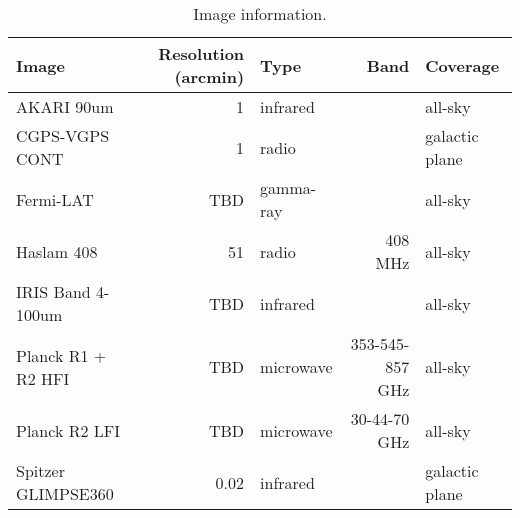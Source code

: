 
\begin{table}[tb]

\caption{Image information.}
\label{tab:images}
\begin{tabular}{ lrlrl }
\hline


Image & Resolution (arcmin) & Type & Band & Coverage\\ \hline
AKARI 90um & 1 & infrared &  & all-sky\\
CGPS-VGPS CONT & 1 & radio &  & galactic plane\\
Fermi-LAT & TBD & gamma-ray &  & all-sky\\
Haslam 408 & 51 & radio & 408 MHz & all-sky\\
IRIS Band 4-100um & TBD & infrared &  & all-sky\\
Planck R1 + R2 HFI & TBD & microwave & 353-545-857 GHz & all-sky\\
Planck R2 LFI & TBD & microwave & 30-44-70 GHz & all-sky\\
Spitzer GLIMPSE360 & 0.02 & infrared &  & galactic plane\\
\hline
\end{tabular}

\end{table}
